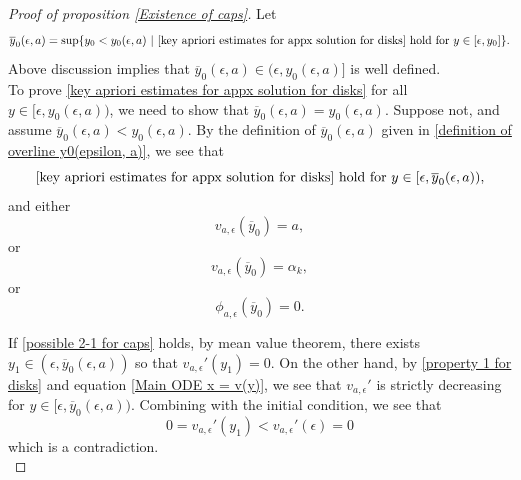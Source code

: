 \documentclass[pdflatex,sn-mathphys-num]{sn-jnl}
\begin{document}
\begin{proof}[Proof of proposition \ref{Existence of caps}]
Let 
\begin{equation}\label{definition of overline y0(epsilon, a)}
    \overline{y}_0(\epsilon, a) = \sup\{y_0 < y_0(\epsilon, a)\ | \ \text{\eqref{key apriori estimates for appx solution for disks} hold for }y \in [\epsilon, y_0] \}. 
\end{equation}
Above discussion implies that $\overline{y}_0(\epsilon, a) \in (\epsilon, y_0(\epsilon, a)]$ is well defined. \\

To prove \eqref{key apriori estimates for appx solution for disks} for all $y \in [\epsilon, y_0(\epsilon, a))$, we need to show that $\overline{y}_0(\epsilon, a) = y_0(\epsilon, a)$. Suppose not, and assume $\overline{y}_0(\epsilon, a) < y_0(\epsilon, a)$. By the definition of $\overline{y}_0(\epsilon, a)$ given in \eqref{definition of overline y0(epsilon, a)}, we see that
\begin{equation}\label{property 1 for disks}
    \text{\eqref{key apriori estimates for appx solution for disks} hold for }y \in [\epsilon, \overline{y}_0(\epsilon, a)),
\end{equation}
and either
\begin{equation}\label{possible 2-1 for caps}
    v_{a, \epsilon}(\overline{y}_0) = a,
\end{equation}
or 
\begin{equation}\label{possible 2-2 for caps}
   v_{a, \epsilon}(\overline{y}_0) = \alpha_k, 
\end{equation}
or 
\begin{equation}\label{possible 2-3 for caps}
\phi_{a, \epsilon}(\overline{y}_0) = 0.    
\end{equation}

If \eqref{possible 2-1 for caps} holds, by mean value theorem, there exists $y_1 \in (\epsilon, \overline{y}_0(\epsilon, a)) $ so that $v_{a, \epsilon}'(y_1) = 0$. On the other hand, by \eqref{property 1 for disks} and equation \eqref{Main ODE x = v(y)}, we see that $v_{a, \epsilon}'$ is strictly decreasing for $y \in [\epsilon, \overline{y}_0(\epsilon,a))$. Combining with the initial condition, we see that
\begin{equation}
    0 = v_{a, \epsilon}'(y_1) < v_{a, \epsilon}'(\epsilon) = 0
\end{equation}
which is a contradiction.\\


\end{proof}
\end{document}
